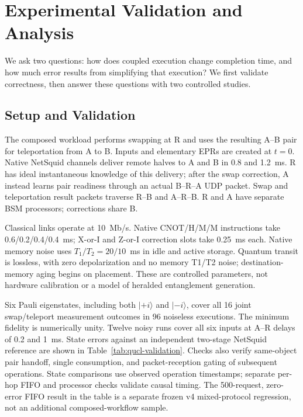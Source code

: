 \providecommand{\quclevalpath}{.}


\section{Experimental Validation and Analysis}
\label{sec:eval}
We ask two questions: how does coupled execution change completion time,
and how much error results from simplifying that execution? We first
validate correctness, then answer these questions with two controlled studies.

\subsection{Setup and Validation}
\label{subsec:setup}
The composed workload performs swapping at R and uses the resulting A--B
pair for teleportation from A to B. Inputs and elementary EPRs are created
at $t=0$. Native NetSquid channels deliver remote halves to A and B in
0.8 and 1.2~ms. R has ideal instantaneous knowledge of this delivery;
after the swap correction, A instead learns pair readiness through an
actual B--R--A UDP packet. Swap and teleportation result packets traverse
R--B and A--R--B. R and A have separate BSM processors; corrections share B.

Classical links operate at 10~Mb/s. Native CNOT/H/M/M instructions take
0.6/0.2/0.4/0.4~ms; X-or-I and Z-or-I correction slots take 0.25~ms each.
Native memory noise uses $T_1/T_2=20/10$~ms in idle and active storage.
Quantum transit is lossless, with zero depolarization and no memory
T1/T2 noise; destination-memory aging begins on placement.
These are controlled parameters, not hardware calibration or a model
of heralded entanglement generation.





Six Pauli eigenstates, including both $|+i\rangle$ and $|-i\rangle$,
cover all 16 joint swap/teleport measurement outcomes in 96 noiseless
executions. The minimum fidelity is numerically unity. Twelve noisy runs
cover all six inputs at A--R delays of 0.2 and 1~ms. State errors against
an independent two-stage NetSquid reference are shown in
Table~\ref{tab:qucl-validation}. Checks also verify same-object pair
handoff, single consumption, and packet-reception gating of subsequent
operations. State comparisons use observed operation timestamps;
separate per-hop FIFO and processor checks validate causal timing.
The 500-request, zero-error FIFO result in the table is a separate frozen
v4 mixed-protocol regression, not an additional composed-workflow sample.

